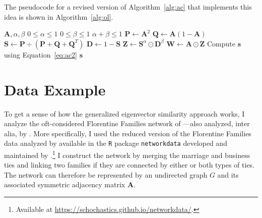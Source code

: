 \documentclass[12pt]{article}
\begin{document}
The pseudocode for a revised version of Algorithm~\ref{alg:ac} that implements this idea is shown in Algorithm~\ref{alg:ol}.

\begin{algorithm}[ht!]
\caption{Proposed Algorithm for Generalized Similarity Scoring}
\label{alg:ol}
\begin{algorithmic}[1]
\Require $\mathbf{A}, \alpha, \beta$ 
\Ensure $0 \le \alpha \le 1$
\Ensure $0 \le \beta \le 1$
\Ensure $\alpha + \beta \le 1$
\State $\mathbf{P} \gets \mathbf{A}^2$ 
\State $\mathbf{Q} \gets \mathbf{A}(1-\mathbf{A})$ 
\State $\mathbf{S} \gets  \mathbf{P} \div \left(\mathbf{P}+\mathbf{Q}+\mathbf{Q}^T\right)$ 
\State $\mathbf{D} \gets 1-\mathbf{S}$ 
\State $\mathbf{Z} \gets \mathbf{S}^\alpha \odot \mathbf{D}^\beta$ 
\State $\mathbf{W} \gets \mathbf{A} \odot \mathbf{Z}$ 
\State Compute $\mathbf{s}$ using Equation~\ref{eq:ac2} 
\State \Return $\mathbf{s}$ 
\end{algorithmic}
\end{algorithm}

\section*{Data Example}
To get a sense of how the generalized eigenvector similarity approach works, I analyze the oft-considered Florentine Families network of \citet{padgett1993robust-4cc}---also analyzed, inter alia, by \citet{alvarez-socorro2015eigencentrality-66c}. More specifically, I used the reduced version of the Florentine Families data analyzed by \citet{breiger1986cumulated-891} available in the \texttt{R} package \texttt{networkdata} developed and maintained by \citet{schoch-network-data}.\footnote{Available at \url{https://schochastics.github.io/networkdata/}.} I construct the network by merging the marriage and business ties and linking two families if they are connected by either or both types of ties. The network can therefore be represented by an undirected graph $G$ and its associated symmetric adjacency matrix $\mathbf{A}$. 
\end{document}
